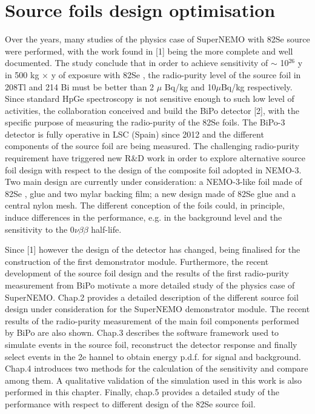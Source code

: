 \documentclass[main.tex]{subfiles}
\begin{document}
\chapter{Source foils design optimisation}




\NI Over the years, many studies of the physics case of SuperNEMO with 82Se source were performed,  with the work found in [1] being the more complete and well documented.  The study conclude that in order to achieve sensitivity of $\sim$ 10$^{26}$ y in 500 kg $\times$ y of exposure with 82Se , the radio-purity level of the source foil in 208Tl and 214 Bi must be better than 2 $\mu$ Bq/kg and 10$\mu$Bq/kg respectively. Since  standard  HpGe  spectroscopy  is  not  sensitive  enough  to  such  low level of activities, the collaboration conceived and build the BiPo detector [2], with the specific purpose of measuring the radio-purity of the 82Se foils. The BiPo-3 detector is fully operative in LSC (Spain) since 2012 and the different components of the source foil are being measured. The challenging radio-purity requirement have triggered new R\&D work in order to explore alternative source foil design with respect to the design of the composite foil adopted in NEMO-3.  Two main design are currently under consideration: a NEMO-3-like foil made of 82Se , glue and two mylar backing film; a new design made of 82Se glue and a central nylon mesh. The different conception of the foils could, in principle, induce differences in the performance, e.g. in the background level and the sensitivity to the 0$\nu\beta\beta$ half-life. 


\bigskip


\NI Since [1] however the design of the detector has changed, being finalised for  the  construction  of  the  first  demonstrator  module.   Furthermore,  the recent  development  of  the  source  foil  design  and  the  results  of  the  first radio-purity measurement from BiPo motivate a more detailed study of the physics case of SuperNEMO. Chap.2 provides a detailed description of the different source foil design under consideration for the SuperNEMO demonstrator module. The recent results of the radio-purity measurement of the main foil components performed by BiPo are also shown. Chap.3 describes the software framework used to simulate events in the source foil, reconstruct the detector response and finally select events in the 2e hannel to obtain energy p.d.f. for signal and background. Chap.4 introduces two methods for the calculation of the sensitivity and compare among them.  A qualitative validation of the simulation used in this work is also performed in this chapter.  Finally, chap.5 provides a detailed study of the performance with respect to different design of the 82Se source foil.
\end{document}
